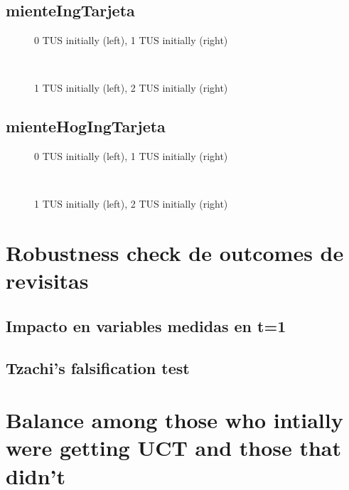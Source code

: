 \documentclass[12pt]{article}
\begin{document}
\subsection{mienteIngTarjeta}
\begin{figure}[H]%
	\centering
	\caption*{0 TUS initially (left), 1 TUS initially (right)}
	 \quad 
	 \\
	
	\caption*{1 TUS initially (left), 2 TUS initially (right)}
	 \qquad
	\label{fig:mienteIngTarjetaTwo}%
\end{figure}

\subsection{mienteHogIngTarjeta}
\begin{figure}[H]%
	\centering
	\caption*{0 TUS initially (left), 1 TUS initially (right)}
	 \quad 
	 \\
	
	\caption*{1 TUS initially (left), 2 TUS initially (right)}
	 \qquad
	\label{fig:mienteHogIngTarjetaTwo}%
\end{figure}

\section{Robustness check de outcomes de revisitas}

\subsection{Impacto en variables medidas en t=1}

\subsection{Tzachi's falsification test}

\section{Balance among those who intially were getting UCT and those that didn't}
\end{document}
